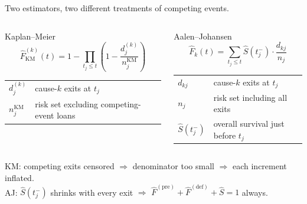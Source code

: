 \documentclass[10pt,aspectratio=169]{beamer}
\begin{document}
\begin{frame}{Two estimators, two different treatments of competing events.}
    \begin{columns}[T,onlytextwidth]
        \begin{block}{Kaplan--Meier}
        \[
            \hat{F}^{(k)}_{\mathrm{KM}}(t)
            = 1 - \prod_{t_j \le t}\!\left(1 - \frac{d_{j}^{(k)}}{n_j^{\mathrm{KM}}}\right)
        \]
        \vspace{0.1em}
        \small
        \begin{tabular}{@{}ll@{}}
            $d_j^{(k)}$ & cause-$k$ exits at $t_j$ \\[2pt]
            $n_j^{\mathrm{KM}}$ & risk set excluding competing-event loans \\[2pt]
        \end{tabular}
        \end{block}

        \begin{block}{Aalen--Johansen}
        \[
            \hat{F}_k(t) = \sum_{t_j \le t} \hat{S}(t_j^{-})\cdot \frac{d_{kj}}{n_j}
        \]
        \vspace{0.1em}
        \small
        \begin{tabular}{@{}ll@{}}
            $d_{kj}$        & cause-$k$ exits at $t_j$ \\[2pt]
            $n_j$           & risk set including all exits \\[2pt]
            $\hat{S}(t_j^-)$ & overall survival just before $t_j$ \\[2pt]
        \end{tabular}
        \end{block}
    \end{columns}
    \vspace{0.6em}
    \begin{center}
        \small
        KM: competing exits censored $\Rightarrow$ denominator too small $\Rightarrow$ each increment inflated.\\[3pt]
        AJ: $\hat{S}(t_j^-)$ shrinks with every exit $\Rightarrow$ $\hat{F}^{(\mathrm{pre})} + \hat{F}^{(\mathrm{def})} + \hat{S} = 1$ always.
    \end{center}
\end{frame}
\end{document}
